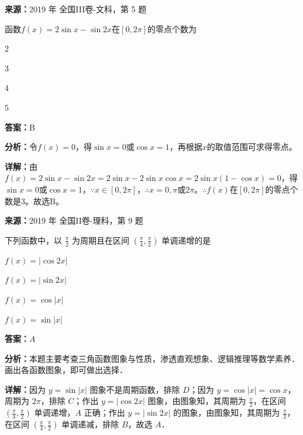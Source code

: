 \begin{question}[points=5]
\textbf{来源：}2019 年 全国III卷-文科，第 5 题\par
函数$f(x)=2\sin x-\sin 2x$在$[0,2\pi]$的零点个数为
\begin{choices}
  \item $2$
  \item $3$
  \item $4$
  \item $5$
\end{choices}
\begin{solution}
\textbf{答案：}B

\textbf{分析：}令$f(x)=0$，得$\sin x=0$或$\cos x=1$，再根据$x$的取值范围可求得零点。

\textbf{详解：}由$f(x)=2\sin x-\sin2x=2\sin x-2\sin x\cos x=2\sin x(1-\cos x)=0$，得$\sin x=0$或$\cos x=1$，$\because x\in[0,2\pi]$，$\therefore x=0,\pi$或$2\pi$。$\therefore f(x)$在$[0,2\pi]$的零点个数是3。故选B。
\end{solution}
\end{question}

\begin{question}[points=5]
\textbf{来源：}2019 年 全国II卷-理科，第 9 题\par
下列函数中，以 $\frac{\pi}{2}$ 为周期且在区间 $(\frac{\pi}{4},\frac{\pi}{2})$ 单调递增的是
\begin{choices}
  \item $f(x)=|\cos 2x|$
  \item $f(x)=|\sin 2x|$
  \item $f(x)=\cos|x|$
  \item $f(x)=\sin|x|$
\end{choices}
\begin{solution}
\textbf{答案：}$A$

\textbf{分析：}本题主要考查三角函数图象与性质，渗透直观想象、逻辑推理等数学素养．画出各函数图象，即可做出选择．

\textbf{详解：}因为 $y=\sin|x|$ 图象不是周期函数，排除 $D$；因为 $y=\cos|x|=\cos x$，周期为 $2\pi$，排除 $C$；作出 $y=|\cos 2x|$ 图象，由图象知，其周期为 $\frac{\pi}{2}$，在区间 $(\frac{\pi}{4},\frac{\pi}{2})$ 单调递增，$A$ 正确；作出 $y=|\sin 2x|$ 的图象，由图象知，其周期为 $\frac{\pi}{2}$，在区间 $(\frac{\pi}{4},\frac{\pi}{2})$ 单调递减，排除 $B$，故选 $A$．
\end{solution}
\end{question}

